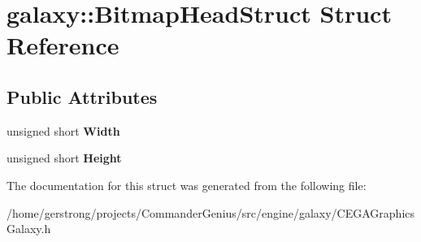 \hypertarget{structgalaxy_1_1_bitmap_head_struct}{
\section{galaxy::BitmapHeadStruct Struct Reference}
\label{structgalaxy_1_1_bitmap_head_struct}
}
\subsection*{Public Attributes}
\begin{DoxyCompactItemize}
\item 
\hypertarget{structgalaxy_1_1_bitmap_head_struct_ab0cf5c9c0cb1f4741ada86dc8066cc13}{
unsigned short {\bfseries Width}}
\label{structgalaxy_1_1_bitmap_head_struct_ab0cf5c9c0cb1f4741ada86dc8066cc13}

\item 
\hypertarget{structgalaxy_1_1_bitmap_head_struct_a8100be4ad992ba80ad5f96ec09f74bc3}{
unsigned short {\bfseries Height}}
\label{structgalaxy_1_1_bitmap_head_struct_a8100be4ad992ba80ad5f96ec09f74bc3}

\end{DoxyCompactItemize}


The documentation for this struct was generated from the following file:\begin{DoxyCompactItemize}
\item 
/home/gerstrong/projects/CommanderGenius/src/engine/galaxy/CEGAGraphicsGalaxy.h\end{DoxyCompactItemize}
